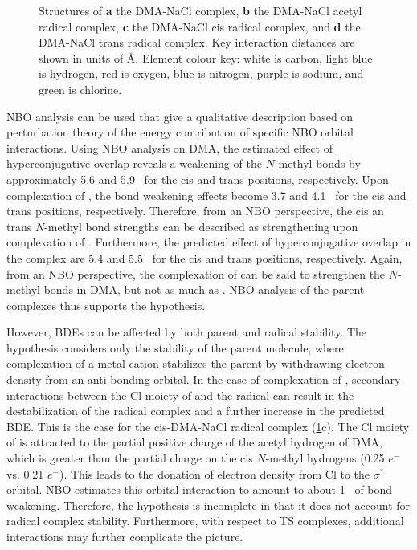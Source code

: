 \begin{doublespace}
\begin{figure}[!htbp]
\caption[Structures of the DMA-NaCl complex and associated radical
complexes.]{Structures of \textbf{a} the DMA-NaCl complex, \textbf{b} the
DMA-NaCl acetyl radical complex, \textbf{c} the DMA-NaCl cis
radical complex, and \textbf{d} the DMA-NaCl trans radical complex. Key
interaction distances are shown in units of \AA. Element colour key: white is
carbon, light blue is hydrogen, red is oxygen, blue is nitrogen, purple is
sodium, and green is chlorine.} \label{fig:dma-na-cl}
\end{figure}

NBO analysis can be used that give a qualitative description based on
perturbation theory of the energy contribution of specific NBO orbital
interactions.\cite{Weinhold2016} Using NBO analysis on DMA, the estimated effect
of hyperconjugative overlap reveals a weakening of the $N$-methyl  bonds
by approximately 5.6 and 5.9 \kcalmol\ for the cis and trans positions,
respectively. Upon complexation of , the bond weakening effects become
3.7 and 4.1 \kcalmol\ for the cis and trans positions, respectively. Therefore,
from an NBO perspective, the cis an trans $N$-methyl bond strengths can be
described as strengthening upon complexation of . Furthermore, the
predicted effect of hyperconjugative overlap in the  complex are
5.4 and 5.5 \kcalmol\ for the cis and trans positions, respectively. Again, from
an NBO perspective, the complexation of  can be said to strengthen the
$N$-methyl  bonds in DMA, but not as much as . NBO analysis of
the parent complexes thus supports the hypothesis.

However, BDEs can be affected by both parent and radical stability. The
hypothesis considers only the stability of the parent molecule, where
complexation of a metal cation stabilizes the parent by withdrawing electron
density from an anti-bonding orbital. In the case of complexation of ,
secondary interactions between the Cl moiety of  and the radical can
result in the destabilization of the radical complex and a further increase in
the predicted  BDE. This is the case for the cis-DMA-NaCl radical
complex (\ref{fig:dma-na-cl}c). The Cl moiety of  is attracted to the
partial positive charge of the acetyl hydrogen of DMA, which is greater than the
partial charge on the cis $N$-methyl hydrogens (0.25 $e^-$ vs. 0.21 $e^-$). This
leads to the donation of electron density from Cl to the  $\sigma^*$
orbital. NBO estimates this orbital interaction to amount to about 1 \kcalmol\
of bond weakening. Therefore, the hypothesis is incomplete in that it does not
account for radical complex stability. Furthermore, with respect to TS
complexes, additional interactions may further complicate the picture.


\end{doublespace}
